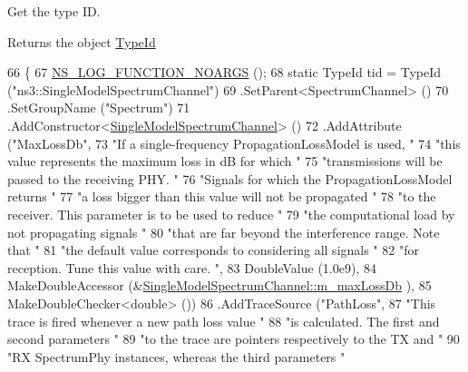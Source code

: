 Get the type ID. 

\begin{DoxyReturn}{Returns}
the object \hyperlink{classns3_1_1TypeId}{Type\+Id} 
\end{DoxyReturn}

\begin{DoxyCode}
66 \{
67   \hyperlink{log-macros-disabled_8h_a8f7e4afc291c9d29a65c18ac1f79197b}{NS\_LOG\_FUNCTION\_NOARGS} ();
68   \textcolor{keyword}{static} TypeId tid = TypeId (\textcolor{stringliteral}{"ns3::SingleModelSpectrumChannel"})
69     .SetParent<SpectrumChannel> ()
70     .SetGroupName (\textcolor{stringliteral}{"Spectrum"})
71     .AddConstructor<\hyperlink{classns3_1_1SingleModelSpectrumChannel_a762ce1ae306c632181512a18593d68a7}{SingleModelSpectrumChannel}> ()
72     .AddAttribute (\textcolor{stringliteral}{"MaxLossDb"},
73                    \textcolor{stringliteral}{"If a single-frequency PropagationLossModel is used, "}
74                    \textcolor{stringliteral}{"this value represents the maximum loss in dB for which "}
75                    \textcolor{stringliteral}{"transmissions will be passed to the receiving PHY. "}
76                    \textcolor{stringliteral}{"Signals for which the PropagationLossModel returns "}
77                    \textcolor{stringliteral}{"a loss bigger than this value will not be propagated "}
78                    \textcolor{stringliteral}{"to the receiver. This parameter is to be used to reduce "}
79                    \textcolor{stringliteral}{"the computational load by not propagating signals "}
80                    \textcolor{stringliteral}{"that are far beyond the interference range. Note that "}
81                    \textcolor{stringliteral}{"the default value corresponds to considering all signals "}
82                    \textcolor{stringliteral}{"for reception. Tune this value with care. "},
83                    DoubleValue (1.0e9),
84                    MakeDoubleAccessor (&\hyperlink{classns3_1_1SingleModelSpectrumChannel_a77e85736d9520060359b9d2f420c0747}{SingleModelSpectrumChannel::m\_maxLossDb}
      ),
85                    MakeDoubleChecker<double> ())
86     .AddTraceSource (\textcolor{stringliteral}{"PathLoss"},
87                      \textcolor{stringliteral}{"This trace is fired whenever a new path loss value "}
88                      \textcolor{stringliteral}{"is calculated. The first and second parameters "}
89                      \textcolor{stringliteral}{"to the trace are pointers respectively to the TX and "}
90                      \textcolor{stringliteral}{"RX SpectrumPhy instances, whereas the third parameters "}

\end{DoxyCode}
